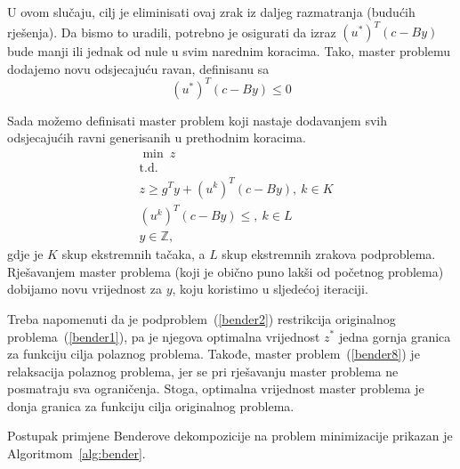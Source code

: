 \documentclass[a4paper, utf8, 11pt, colorlinks]{book}
\theoremstyle{definition}
\begin{document}
U ovom slučaju, cilj je eliminisati ovaj zrak iz daljeg razmatranja (budućih rješenja). Da bismo to uradili, potrebno je osigurati da izraz $(u^*)^T(c-By)$ bude manji ili jednak od nule u svim narednim koracima. Tako, master problemu dodajemo novu odsjecajuću ravan, definisanu sa
\begin{equation}
	\label{bender7}
	(u^*)^T(c-By)\leqslant 0
\end{equation}
 
Sada možemo definisati master problem koji nastaje dodavanjem svih odsjecajućih ravni generisanih u prethodnim koracima.
  \begin{equation}
	\begin{aligned}\label{bender8}
		&\min\ z\\
		&\mbox{t.d.} \\
		&z \geq g^Ty+(u^k)^T(c-By) , \ k \in K\\
		& (u^k)^T(c-By) \leq, \ k \in L\\
		&y \in \mathbb{Z},
	\end{aligned}
\end{equation}
 gdje je $K$ skup ekstremnih tačaka, a $L$ skup ekstremnih zrakova podproblema. Rješavanjem master problema (koji je obično puno lakši od početnog problema) dobijamo novu vrijednost za $y$, koju koristimo u sljedećoj iteraciji.
 
 Treba napomenuti da je podproblem~(\ref{bender2}) restrikcija originalnog problema~(\ref{bender1}), pa je njegova optimalna vrijednost $z^*$ jedna gornja granica za funkciju cilja polaznog problema. Takođe, master problem~(\ref{bender8}) je relaksacija polaznog problema, jer se pri rješavanju master problema ne posmatraju sva ograničenja. Stoga, optimalna vrijednost master problema je donja granica za funkciju cilja originalnog problema.
 
 Postupak primjene Benderove dekompozicije na problem minimizacije prikazan je Algoritmom~\ref{alg:bender}.

 
 
\end{document}

